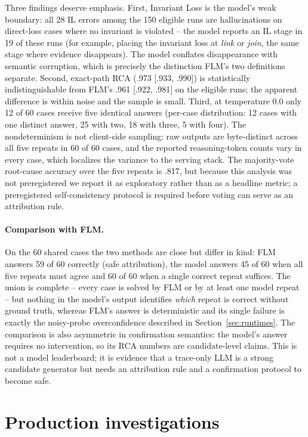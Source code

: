 \documentclass[10pt]{article}
\begin{document}
Three findings deserve emphasis. First, Invariant Loss is the model's weak boundary: all 28 IL errors among the 150 eligible runs are hallucinations on direct-loss cases where no invariant is violated -- the model reports an IL stage in 19 of these runs (for example, placing the invariant loss at \emph{link} or \emph{join}, the same stage where evidence disappears). The model conflates disappearance with semantic corruption, which is precisely the distinction FLM's two definitions separate. Second, exact-path RCA (.973 [.933, .990]) is statistically indistinguishable from FLM's .961 [.922, .981] on the eligible runs; the apparent difference is within noise and the sample is small. Third, at temperature $0.0$ only 12 of 60 cases receive five identical answers (per-case distribution: 12 cases with one distinct answer, 25 with two, 18 with three, 5 with four). The nondeterminism is not client-side sampling: raw outputs are byte-distinct across all five repeats in 60 of 60 cases, and the reported reasoning-token counts vary in every case, which localizes the variance to the serving stack. The majority-vote root-cause accuracy over the five repeats is .817, but because this analysis was not preregistered we report it as exploratory rather than as a headline metric; a preregistered self-consistency protocol is required before voting can serve as an attribution rule.

\paragraph{Comparison with FLM.}
On the 60 shared cases the two methods are close but differ in kind: FLM answers 59 of 60 correctly (safe attribution), the model answers 45 of 60 when all five repeats must agree and 60 of 60 when a single correct repeat suffices. The union is complete -- every case is solved by FLM or by at least one model repeat -- but nothing in the model's output identifies \emph{which} repeat is correct without ground truth, whereas FLM's answer is deterministic and its single failure is exactly the noisy-probe overconfidence described in Section~\ref{sec:runtimes}. The comparison is also asymmetric in confirmation semantics: the model's answer requires no intervention, so its RCA numbers are candidate-level claims. This is not a model leaderboard; it is evidence that a trace-only LLM is a strong candidate generator but needs an attribution rule and a confirmation protocol to become safe.

\section{Production investigations}
\label{sec:production}
\end{document}
